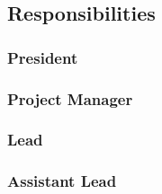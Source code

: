\subsection{Responsibilities}
\label{roles:responsibilities}

\subsubsection{President}
\label{roles:responsibilities:president}

\subsubsection{Project Manager}
\label{roles:responsibilities:pm}

\subsubsection{Lead}
\label{roles:responsibilities:lead}

\subsubsection{Assistant Lead}
\label{roles:responsibilities:assistant}
